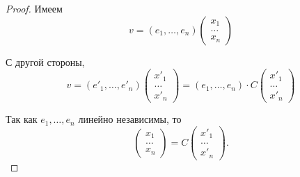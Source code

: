 \begin{proof}
    Имеем
    \begin{equation*}
        v = (e_1, \dots, e_n) \begin{pmatrix} x_1 \\ \dots \\ x_n \end{pmatrix}
    \end{equation*} 

    С другой стороны,
    \begin{equation*}
        v = (e'_1, \dots, e'_n) \begin{pmatrix} x'_1 \\ \dots \\ x'_n \end{pmatrix} = (e_1, \dots, e_n) \cdot C \begin{pmatrix} x'_1 \\ \dots \\ x'_n \end{pmatrix}
    \end{equation*}

    Так как $e_1, \dots, e_n$ линейно независимы, то
    \begin{equation*}
        \begin{pmatrix} x_1 \\ \dots \\ x_n \end{pmatrix}
        = C \begin{pmatrix} x'_1 \\ \dots \\ x'_n \end{pmatrix}
    .\end{equation*}
\end{proof}

